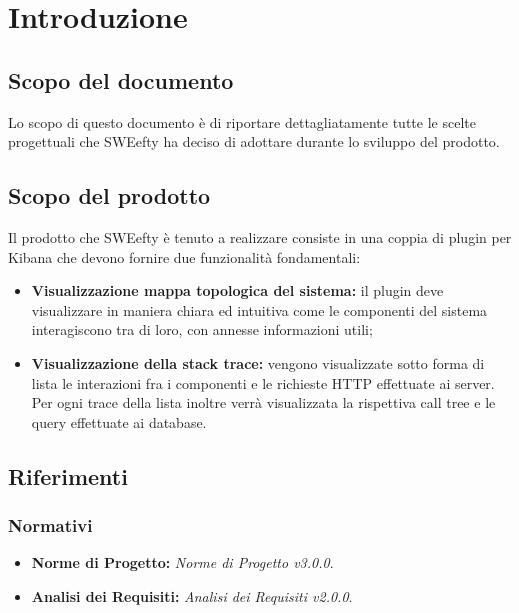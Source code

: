 \section{Introduzione}
\label{sec:intro}
	\subsection{Scopo del documento}
	Lo scopo di questo documento è di riportare dettagliatamente tutte le scelte progettuali che SWEefty ha deciso di adottare durante lo sviluppo del prodotto.
	
	\subsection{Scopo del prodotto}
	Il prodotto che SWEefty è tenuto a realizzare consiste in una coppia di plugin per Kibana che devono fornire due funzionalità fondamentali:
	\begin{itemize}
		\item \textbf{Visualizzazione mappa topologica del sistema:} il plugin deve visualizzare in maniera chiara ed intuitiva come le componenti del sistema interagiscono tra di loro, con annesse informazioni utili;
		\item \textbf{Visualizzazione della stack trace:} vengono visualizzate sotto forma di lista le interazioni fra i componenti e le richieste HTTP effettuate ai server. Per ogni trace della lista inoltre verrà visualizzata la rispettiva call tree e le query effettuate ai database.
	\end{itemize}

	\subsection{Riferimenti}
		\subsubsection{Normativi}
			\begin{itemize}
				\item \textbf{Norme di Progetto:} \emph{Norme di Progetto v3.0.0}.
				\item \textbf{Analisi dei Requisiti:} \emph{Analisi dei Requisiti v2.0.0}.
			\end{itemize}

